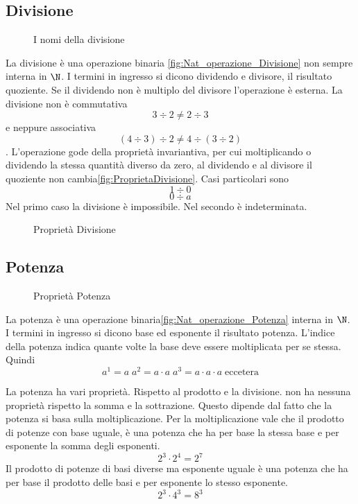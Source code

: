 \subsection{Divisione}
\label{sec:Numerinatdiv}
\begin{figure} %
	\centering

	\caption{I nomi della divisione}
	\label{fig:ProprietaDivisione}
	\end{figure}
La divisione è una operazione binaria \nobs\vref{fig:Nat_operazione_Divisione} non sempre interna in $\N$. I termini in ingresso si dicono dividendo e divisore, il risultato quoziente. Se il dividendo non è  multiplo  del divisore l'operazione è esterna. La divisione non è commutativa \[3\div2\neq2\div3\] e neppure associativa \[(4\div3)\div2\neq4\div(3\div2)\]. L'operazione gode della proprietà invariantiva, per cui moltiplicando  o dividendo la stessa quantità diverso da zero, al dividendo e al divisore il quoziente non cambia\nobs\vref{fig:ProprietaDivisione}. Casi particolari sono \[1\div0\] \[0\div a\] Nel primo caso la divisione è impossibile. Nel secondo è indeterminata.
\begin{figure} %
	\centering

	\caption{Proprietà Divisione}
		\label{fig:ProprietaDivisione2}
	\end{figure}
\subsection{Potenza}
\label{sec:NumerinatPot}
\begin{figure} %
	\centering

	\caption{Proprietà Potenza}
	\label{fig:ProprietaPotenza}\end{figure}
La potenza è una operazione binaria\nobs\vref{fig:Nat_operazione_Potenza}  interna in $\N$. I termini in ingresso si dicono base ed esponente il risultato potenza. L'indice della potenza indica quante volte la base deve essere moltiplicata per se stessa. Quindi\[a^1=a\; a^2=a\cdot a\; a^3=a\cdot a\cdot a\; \text{eccetera} \] 

La potenza ha vari proprietà. Rispetto al prodotto e la divisione. non ha nessuna proprietà rispetto la somma e la sottrazione. Questo dipende dal fatto che la potenza si basa sulla moltiplicazione. 
Per la moltiplicazione vale che il prodotto di potenze con base uguale, è una potenza che ha per base la stessa base e per esponente la somma degli esponenti.\[ 2^3\cdot 2^4=2^7 \] Il prodotto di potenze di basi diverse ma esponente uguale è una potenza che ha per base il prodotto delle basi e per esponente lo stesso esponente.\[2^3\cdot 4^3=8^3\] 

